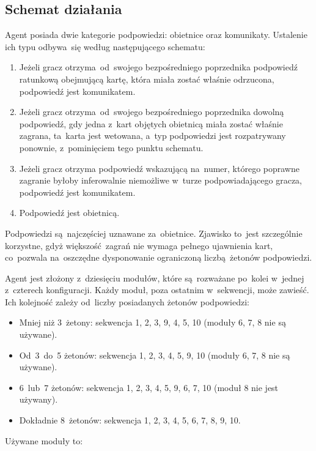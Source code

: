 \documentclass[declaration,shortabstract,inz]{iithesis}
\begin{document}
\subsection*{Schemat działania}

Agent posiada dwie kategorie podpowiedzi: obietnice oraz komunikaty. Ustalenie ich typu odbywa~się według następującego schematu:

\begin{enumerate}
	\item Jeżeli gracz otrzyma od~swojego bezpośredniego poprzednika podpowiedź ratunkową obejmującą kartę, która miała zostać właśnie odrzucona, podpowiedź jest komunikatem.
	\item Jeżeli gracz otrzyma od~swojego bezpośredniego poprzednika dowolną podpowiedź, gdy jedna z~kart objętych obietnicą miała zostać właśnie zagrana, ta~karta jest wetowana, a~typ podpowiedzi jest rozpatrywany ponownie, z~pominięciem tego punktu schematu.
	\item Jeżeli gracz otrzyma podpowiedź wskazującą na~numer, którego poprawne zagranie byłoby inferowalnie niemożliwe w~turze podpowiadającego gracza, podpowiedź jest komunikatem.
	\item Podpowiedź jest obietnicą.
\end{enumerate}

Podpowiedzi są~najczęściej uznawane za~obietnice. Zjawisko to~jest szczególnie korzystne, gdyż większość zagrań nie wymaga pełnego ujawnienia kart, co~pozwala na~oszczędne dysponowanie ograniczoną liczbą żetonów podpowiedzi.

Agent jest złożony z~dziesięciu modułów, które są~rozważane po~kolei w~jednej z~czterech konfiguracji. Każdy moduł, poza ostatnim w~sekwencji, może zawieść. Ich kolejność zależy od~liczby posiadanych żetonów podpowiedzi:

\begin{itemize}
	\item Mniej niż 3~żetony: sekwencja 1, 2, 3, 9, 4, 5, 10 (moduły 6, 7, 8 nie są używane).
	\item Od~3~do~5 żetonów: sekwencja 1, 2, 3, 4, 5, 9, 10 (moduły 6, 7, 8 nie są używane).
	\item 6~lub~7 żetonów: sekwencja 1, 2, 3, 4, 5, 9, 6, 7, 10 (moduł 8 nie jest używany).
	\item Dokładnie 8~żetonów: sekwencja 1, 2, 3, 4, 5, 6, 7, 8, 9, 10.
\end{itemize}
Używane moduły to:
\end{document}

